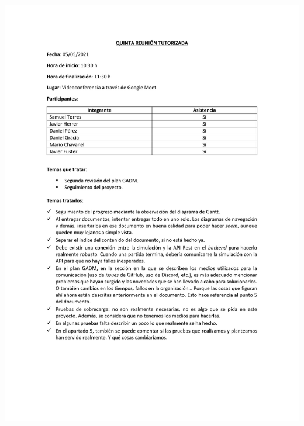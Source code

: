 \documentclass{article}
\begin{document}
\includegraphics[width=\textwidth]{../images/actas/Acta_reunion_tutorizada_5.pdf}
\end{document}
